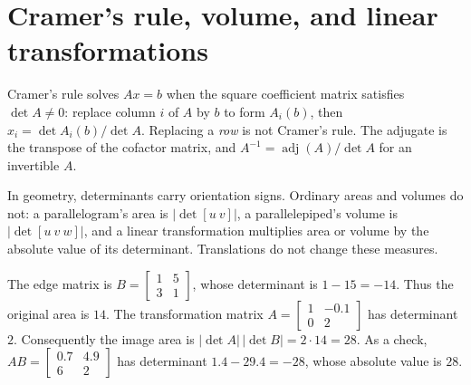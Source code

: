 \section{Cramer's rule, volume, and linear transformations}
Cramer's rule solves $Ax=b$ when the square coefficient matrix satisfies $\det A\ne0$: replace column $i$ of $A$ by $b$ to form $A_i(b)$, then $x_i=\det A_i(b)/\det A$. Replacing a \emph{row} is not Cramer's rule. The adjugate is the transpose of the cofactor matrix, and $A^{-1}=\operatorname{adj}(A)/\det A$ for an invertible $A$.

In geometry, determinants carry orientation signs. Ordinary areas and volumes do not: a parallelogram's area is $|\det[u\ v]|$, a parallelepiped's volume is $|\det[u\ v\ w]|$, and a linear transformation multiplies area or volume by the absolute value of its determinant. Translations do not change these measures.

The edge matrix is $B=\left[\begin{smallmatrix}1&5\\3&1\end{smallmatrix}\right]$, whose determinant is $1-15=-14$. Thus the original area is $14$. The transformation matrix $A=\left[\begin{smallmatrix}1&-0.1\\0&2\end{smallmatrix}\right]$ has determinant $2$. Consequently the image area is $|\det A|\,|\det B|=2\cdot14=28$. As a check, $AB=\left[\begin{smallmatrix}0.7&4.9\\6&2\end{smallmatrix}\right]$ has determinant $1.4-29.4=-28$, whose absolute value is $28$.

